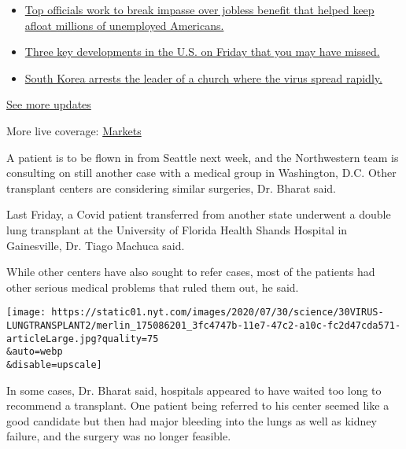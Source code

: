 \begin{itemize}
\tightlist
\item
  \href{https://www.nytimes.com/2020/08/01/world/coronavirus-covid-19.html?action=click\&pgtype=Article\&state=default\&region=MAIN_CONTENT_1\&context=storylines_live_updates\#link-2e88f231}{Top
  officials work to break impasse over jobless benefit that helped keep
  afloat millions of unemployed Americans.}
\item
  \href{https://www.nytimes.com/2020/08/01/world/coronavirus-covid-19.html?action=click\&pgtype=Article\&state=default\&region=MAIN_CONTENT_1\&context=storylines_live_updates\#link-586d44ab}{Three
  key developments in the U.S. on Friday that you may have missed.}
\item
  \href{https://www.nytimes.com/2020/08/01/world/coronavirus-covid-19.html?action=click\&pgtype=Article\&state=default\&region=MAIN_CONTENT_1\&context=storylines_live_updates\#link-2b88e858}{South
  Korea arrests the leader of a church where the virus spread rapidly.}
\end{itemize}

\href{https://www.nytimes.com/2020/08/01/world/coronavirus-covid-19.html?action=click\&pgtype=Article\&state=default\&region=MAIN_CONTENT_1\&context=storylines_live_updates}{See
more updates}

More live coverage:
\href{https://www.nytimes.com/live/2020/07/31/business/stock-market-today-coronavirus?action=click\&pgtype=Article\&state=default\&region=MAIN_CONTENT_1\&context=storylines_live_updates}{Markets}

A patient is to be flown in from Seattle next week, and the Northwestern
team is consulting on still another case with a medical group in
Washington, D.C. Other transplant centers are considering similar
surgeries, Dr. Bharat said.

Last Friday, a Covid patient transferred from another state underwent a
double lung transplant at the University of Florida Health Shands
Hospital in Gainesville, Dr. Tiago Machuca said.

While other centers have also sought to refer cases, most of the
patients had other serious medical problems that ruled them out, he
said.

\texttt{[image: https://static01.nyt.com/images/2020/07/30/science/30VIRUS-LUNGTRANSPLANT2/merlin\_175086201\_3fc4747b-11e7-47c2-a10c-fc2d47cda571-articleLarge.jpg?quality=75\\\&auto=webp\\\&disable=upscale]}

In some cases, Dr. Bharat said, hospitals appeared to have waited too
long to recommend a transplant. One patient being referred to his center
seemed like a good candidate but then had major bleeding into the lungs
as well as kidney failure, and the surgery was no longer feasible.

